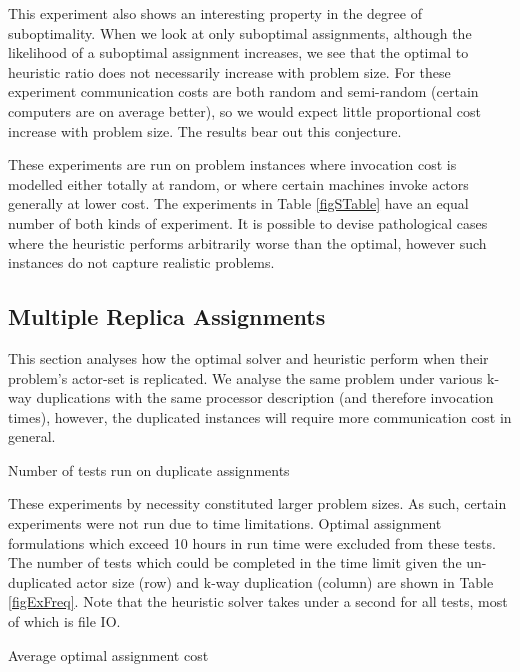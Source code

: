 This experiment also shows an interesting property in the degree of suboptimality.
When we look at only suboptimal assignments, although the likelihood of a suboptimal assignment increases, we see that the optimal to heuristic ratio does not necessarily increase with problem size.
For these experiment communication costs are both random and semi-random (certain computers are on average better), so we would expect little proportional cost increase with problem size.
The results bear out this conjecture.

These experiments are run on problem instances where invocation cost is modelled either totally at random, or where certain machines invoke actors generally at lower cost.
The experiments in Table \ref{figSTable} have an equal number of both kinds of experiment.
It is possible to devise pathological cases where the heuristic performs arbitrarily worse than the optimal, however such instances do not capture realistic problems.

\subsection{Multiple Replica Assignments}
\label{secExMulAssign}

This section analyses how the optimal solver and heuristic perform when their problem's actor-set is replicated.
We analyse the same problem under various k-way duplications with the same processor description (and therefore invocation times), however, the duplicated instances will require more communication cost in general.

\begin{table}
\begin{center}
	
\caption{Number of tests run on duplicate assignments}
\label{figExFreq}
\end{center}
\end{table}

These experiments by necessity constituted larger problem sizes.
As such, certain experiments were not run due to time limitations.
Optimal assignment formulations which exceed 10 hours in run time were excluded from these tests.
The number of tests which could be completed in the time limit given the un-duplicated actor size (row) and k-way duplication (column) are shown in Table \ref{figExFreq}.
Note that the heuristic solver takes under a second for all tests, most of which is file IO.

\begin{table}
\begin{center}
	
\caption{Average optimal assignment cost}
\label{figExRamp}
\end{center}
\end{table}

